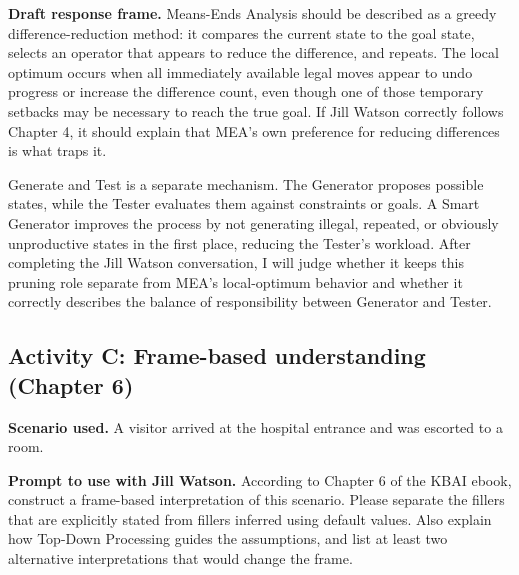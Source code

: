 \documentclass[
	letterpaper, %
]{jdf}
\begin{document}
\textbf{Draft response frame.} Means-Ends Analysis should be described as a greedy difference-reduction method: it compares the current state to the goal state, selects an operator that appears to reduce the difference, and repeats. The local optimum occurs when all immediately available legal moves appear to undo progress or increase the difference count, even though one of those temporary setbacks may be necessary to reach the true goal. If Jill Watson correctly follows Chapter 4, it should explain that MEA's own preference for reducing differences is what traps it.

Generate and Test is a separate mechanism. The Generator proposes possible states, while the Tester evaluates them against constraints or goals. A Smart Generator improves the process by not generating illegal, repeated, or obviously unproductive states in the first place, reducing the Tester's workload. After completing the Jill Watson conversation, I will judge whether it keeps this pruning role separate from MEA's local-optimum behavior and whether it correctly describes the balance of responsibility between Generator and Tester.

\subsection{Activity C: Frame-based understanding (Chapter 6)}

%
%
%

\textbf{Scenario used.} A visitor arrived at the hospital entrance and was escorted to a room.

\textbf{Prompt to use with Jill Watson.} According to Chapter 6 of the KBAI ebook, construct a frame-based interpretation of this scenario. Please separate the fillers that are explicitly stated from fillers inferred using default values. Also explain how Top-Down Processing guides the assumptions, and list at least two alternative interpretations that would change the frame.
\end{document}
